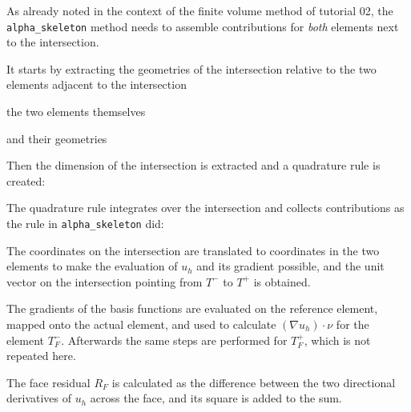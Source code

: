 \documentclass[a4paper,12pt]{article}
\begin{document}
As already noted in the context of the finite volume method of tutorial 02,
the \lstinline{alpha_skeleton} method needs to assemble contributions for
\textit{both} elements next to the intersection.

It starts by extracting the geometries of the intersection relative to the
two elements adjacent to the intersection

the two elements themselves

and their geometries


Then the dimension of the intersection is extracted and a quadrature rule is
created:


The quadrature rule integrates over the intersection and collects contributions
as the rule in \lstinline{alpha_skeleton} did:


The coordinates on the intersection are translated to coordinates in the two
elements to make the evaluation of $u_h$ and its gradient possible, and the
unit vector on the intersection pointing from $T^-$ to $T^+$ is obtained.


The gradients of the basis functions are evaluated on the reference element,
mapped onto the actual element, and used to calculate $(\nabla u_h) \cdot \nu$
for the element $T_F^-$. Afterwards the same steps are performed for $T_F^+$,
which is not repeated here.


The face residual $R_F$ is calculated as the difference between the two
directional derivatives of $u_h$ across the face, and its square is added to
the sum.

\end{document}
